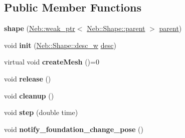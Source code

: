 \subsection*{\-Public \-Member \-Functions}
\begin{DoxyCompactItemize}
\item 
\hypertarget{classNeb_1_1Shape_1_1shape_ab541b376a9dc6c86368b0374efa72247}{{\bfseries shape} (\hyperlink{classNeb_1_1weak__ptr}{\-Neb\-::weak\-\_\-ptr}$<$ \hyperlink{classNeb_1_1Shape_1_1parent}{\-Neb\-::\-Shape\-::parent} $>$ \hyperlink{classNeb_1_1Shape_1_1parent}{parent})}\label{classNeb_1_1Shape_1_1shape_ab541b376a9dc6c86368b0374efa72247}

\item 
\hypertarget{classNeb_1_1Shape_1_1shape_af467bc3c9286f1d10114480c9d5d0db0}{void {\bfseries init} (\hyperlink{classNeb_1_1weak__ptr}{\-Neb\-::\-Shape\-::desc\-\_\-w} \hyperlink{classNeb_1_1Shape_1_1desc}{desc})}\label{classNeb_1_1Shape_1_1shape_af467bc3c9286f1d10114480c9d5d0db0}

\item 
\hypertarget{classNeb_1_1Shape_1_1shape_aa7a6106b9e5901d903b527b171cf8800}{virtual void {\bfseries create\-Mesh} ()=0}\label{classNeb_1_1Shape_1_1shape_aa7a6106b9e5901d903b527b171cf8800}

\item 
\hypertarget{classNeb_1_1Shape_1_1shape_ada83179ec6b4f3737a6e5ef2eb29564d}{void {\bfseries release} ()}\label{classNeb_1_1Shape_1_1shape_ada83179ec6b4f3737a6e5ef2eb29564d}

\item 
\hypertarget{classNeb_1_1Shape_1_1shape_a7ce08185aa4431ec2f39fef1e1933a7a}{void {\bfseries cleanup} ()}\label{classNeb_1_1Shape_1_1shape_a7ce08185aa4431ec2f39fef1e1933a7a}

\item 
\hypertarget{classNeb_1_1Shape_1_1shape_adb1a3c375e57fbf636182719f4f8f2a3}{void {\bfseries step} (double time)}\label{classNeb_1_1Shape_1_1shape_adb1a3c375e57fbf636182719f4f8f2a3}

\item 
\hypertarget{classNeb_1_1Shape_1_1shape_ac96d4dc310d2393672bf331a9b4eaad9}{void {\bfseries notify\-\_\-foundation\-\_\-change\-\_\-pose} ()}\label{classNeb_1_1Shape_1_1shape_ac96d4dc310d2393672bf331a9b4eaad9}

\end{DoxyCompactItemize}
